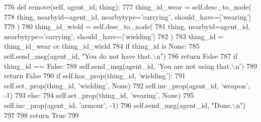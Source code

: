 \begin{DoxyCode}
776     \textcolor{keyword}{def }remove(self, agent\_id, thing):
777         thing\_id\_wear = self.desc\_to\_node(
778             thing, nearbyid=agent\_id, nearbytype=\textcolor{stringliteral}{'carrying'}, should\_have=[\textcolor{stringliteral}{'wearing'}]
779         )
780         thing\_id\_wield = self.desc\_to\_node(
781             thing, nearbyid=agent\_id, nearbytype=\textcolor{stringliteral}{'carrying'}, should\_have=[\textcolor{stringliteral}{'wielding'}]
782         )
783         thing\_id = thing\_id\_wear \textcolor{keywordflow}{or} thing\_id\_wield
784         \textcolor{keywordflow}{if} thing\_id \textcolor{keywordflow}{is} \textcolor{keywordtype}{None}:
785             self.send\_msg(agent\_id, \textcolor{stringliteral}{"You do not have that.\(\backslash\)n"})
786             \textcolor{keywordflow}{return} \textcolor{keyword}{False}
787         \textcolor{keywordflow}{if} thing\_id == \textcolor{keyword}{False}:
788             self.send\_msg(agent\_id, \textcolor{stringliteral}{'You are not using that.\(\backslash\)n'})
789             \textcolor{keywordflow}{return} \textcolor{keyword}{False}
790         \textcolor{keywordflow}{if} self.has\_prop(thing\_id, \textcolor{stringliteral}{'wielding'}):
791             self.set\_prop(thing\_id, \textcolor{stringliteral}{'wielding'}, \textcolor{keywordtype}{None})
792             self.inc\_prop(agent\_id, \textcolor{stringliteral}{'weapon'}, -1)
793         \textcolor{keywordflow}{else}:
794             self.set\_prop(thing\_id, \textcolor{stringliteral}{'wearing'}, \textcolor{keywordtype}{None})
795             self.inc\_prop(agent\_id, \textcolor{stringliteral}{'armour'}, -1)
796         self.send\_msg(agent\_id, \textcolor{stringliteral}{"Done.\(\backslash\)n"})
797 
798         \textcolor{keywordflow}{return} \textcolor{keyword}{True}
799 
\end{DoxyCode}
\mbox{\label{classprojects_1_1mastering__the__dungeon_1_1tasks_1_1graph__world2_1_1graph_1_1Graph_a7d58b9a688d3a775f150c7a40a72c11d}} 
